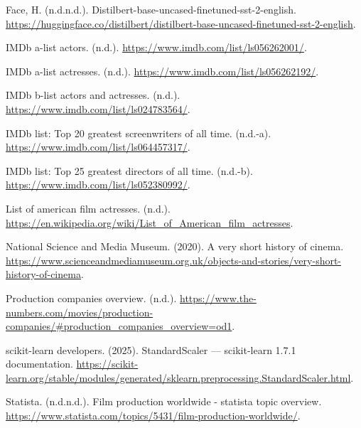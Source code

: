 \documentclass[
]{agujournal2019}
\newlength{\cslhangindent}
\newenvironment{CSLReferences}[2] %
 {\begin{list}{}{%
  \setlength{\itemindent}{0pt}
  \setlength{\leftmargin}{0pt}
  \setlength{\parsep}{0pt}
  \ifodd #1
   \setlength{\leftmargin}{\cslhangindent}
   \setlength{\itemindent}{-1\cslhangindent}
  \fi
  \setlength{\itemsep}{#2\baselineskip}}}
 {\end{list}}
\begin{document}
\label{refs}
\begin{CSLReferences}{1}{0}
Face, H. (n.d.n.d.). Distilbert-base-uncased-finetuned-sst-2-english.
\url{https://huggingface.co/distilbert/distilbert-base-uncased-finetuned-sst-2-english}.

IMDb a-list actors. (n.d.).
\url{https://www.imdb.com/list/ls056262001/}.

IMDb a-list actresses. (n.d.).
\url{https://www.imdb.com/list/ls056262192/}.

IMDb b-list actors and actresses. (n.d.).
\url{https://www.imdb.com/list/ls024783564/}.

IMDb list: Top 20 greatest screenwriters of all time. (n.d.-a).
\url{https://www.imdb.com/list/ls064457317/}.

IMDb list: Top 25 greatest directors of all time. (n.d.-b).
\url{https://www.imdb.com/list/ls052380992/}.

List of american film actresses. (n.d.).
\url{https://en.wikipedia.org/wiki/List_of_American_film_actresses}.

National Science and Media Museum. (2020). A very short history of
cinema.
\url{https://www.scienceandmediamuseum.org.uk/objects-and-stories/very-short-history-of-cinema}.

Production companies overview. (n.d.).
\url{https://www.the-numbers.com/movies/production-companies/\#production_companies_overview=od1}.

scikit-learn developers. (2025). StandardScaler --- scikit-learn 1.7.1
documentation.
\url{https://scikit-learn.org/stable/modules/generated/sklearn.preprocessing.StandardScaler.html}.

Statista. (n.d.n.d.). Film production worldwide - statista topic
overview.
\url{https://www.statista.com/topics/5431/film-production-worldwide/}.

\end{CSLReferences}
\end{document}
